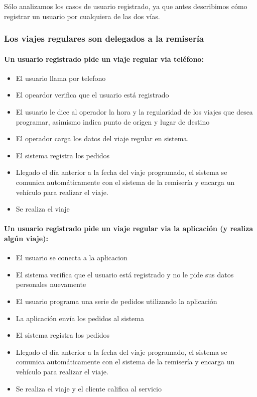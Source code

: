 \documentclass[a4paper]{artcle}
\begin{document}
S\'olo analizamos los casos de usuario registrado, ya que antes describimos c\'omo registrar un usuario por cualquiera de las dos v\'ias.

\subsubsection{Los viajes regulares son delegados a la remiser\'ia}

\paragraph{Un usuario registrado pide un viaje regular via tel\'efono:}
\begin{itemize}
\item El usuario llama por telefono
\item El opeardor verifica que el usuario est\'a registrado
\item El usuario le dice al operador la hora y la regularidad de los viajes que desea programar, asimismo indica punto de origen y lugar de destino
\item El operador carga los datos del viaje regular en sistema.
\item El sistema registra los pedidos 
\item Llegado el d\'ia anterior a la fecha del viaje programado, el sistema se comunica autom\'aticamente con el sistema de la remiser\'ia y encarga un veh\'iculo para realizar el viaje.
\item Se realiza el viaje
\end{itemize}


\paragraph{Un usuario registrado pide un viaje regular via la aplicaci\'on (y realiza alg\'un viaje):}
\begin{itemize}
\item El usuario se conecta a la aplicacion
\item El sistema verifica que el usuario est\'a registrado y no le pide sus datos personales nuevamente
\item El usuario programa una serie de pedidos utilizando la aplicaci\'on
\item La aplicaci\'on env\'ia los pedidos al sistema
\item El sistema registra los pedidos 
\item Llegado el d\'ia anterior a la fecha del viaje programado, el sistema se comunica autom\'aticamente con el sistema de la remiser\'ia y encarga un veh\'iculo para realizar el viaje.
\item Se realiza el viaje y el cliente califica al servicio
\end{itemize}
\end{document}
